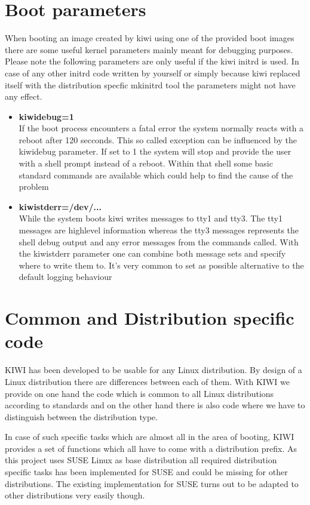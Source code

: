 \section{Boot parameters}
When booting an image created by kiwi using one of the provided
boot images there are some useful kernel parameters mainly meant
for debugging purposes. Please note the following parameters are
only useful if the kiwi initrd is used. In case of any other
initrd code written by yourself or simply because kiwi replaced
itself with the distribution specfic mkinitrd tool the parameters
might not have any effect.

\begin{itemize}
\item \textbf{kiwidebug=1}\\
      If the boot process encounters a fatal error the system normally
      reacts with a reboot after 120 secconds. This so called exception
      can be influenced by the kiwidebug parameter. If set to 1 the system
      will stop and provide the user with a shell prompt instead of a
      reboot. Within that shell some basic standard commands are
      available which could help to find the cause of the problem
\item \textbf{kiwistderr=/dev/...}\\
      While the system boots kiwi writes messages to tty1 and tty3. The
      tty1 messages are highlevel information whereas the tty3 messages
      represents the shell debug output and any error messages from
      the commands called. With the kiwistderr parameter one can combine
      both message sets and specify where to write them to. It's very
      common to set  as possible alternative to the default
      logging behaviour
\end{itemize}

\section{Common and Distribution specific code}
KIWI has been developed to be usable for any Linux distribution.
By design of a Linux distribution there are differences between
each of them. With KIWI we provide on one hand the code which
is common to all Linux distributions according to standards and
on the other hand there is also code where we have to distinguish
between the distribution type.

In case of such specific tasks which are almost all in the area
of booting, KIWI provides a set of functions which all have to come
with a distribution prefix. As this project uses SUSE Linux as
base distribution all required distribution specific tasks has been
implemented for SUSE and could be missing for other distributions.
The existing implementation for SUSE turns out to be adapted to other
distributions very easily though.


